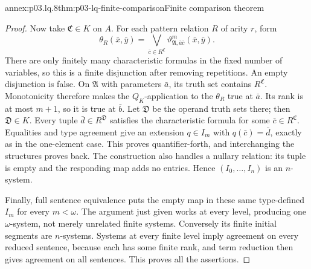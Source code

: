 \begin{annexitem}{annex:p03.lq.8}{thm:p03-lq-finite-comparison}{Finite comparison theorem}
\begin{proof}
Now take \(\mathfrak C\in K\) on \(A\). For each pattern relation
\(R\) of arity \(r\), form
\[
 \theta_R(\bar x,\bar y)
   =\bigvee_{\bar c\in R^{\mathfrak C}}
          \vartheta^m_{\mathfrak A,\bar a\bar c}(\bar x,\bar y).
\]
There are only finitely many characteristic formulas in the fixed
number of variables, so this is a finite disjunction after removing
repetitions. An empty disjunction is false. On \(\mathfrak A\)
with parameters \(\bar a\), its truth set contains
\(R^{\mathfrak C}\). Monotonicity therefore makes the
\(Q_K\)-application to the \(\theta_R\) true at \(\bar a\).
Its rank is at most \(m+1\), so it is true at \(\bar b\).
Let \(\mathfrak D\) be the operand truth sets there; then
\(\mathfrak D\in K\). Every tuple \(\bar d\in R^{\mathfrak D}\)
satisfies the characteristic formula for some
\(\bar c\in R^{\mathfrak C}\). Equalities and type agreement give
an extension \(q\in I_m\) with \(q(\bar c)=\bar d\), exactly
as in the one-element case. This proves quantifier-forth, and
interchanging the structures proves back. The construction also
handles a nullary relation: its tuple is empty and the responding
map adds no entries. Hence \((I_0,\ldots,I_n)\) is an \(n\)-system.

Finally, full sentence equivalence puts the empty map in these same
type-defined \(I_m\) for every \(m<\omega\). The argument just
given works at every level, producing one \(\omega\)-system, not
merely unrelated finite systems. Conversely its finite initial
segments are \(n\)-systems. Systems at every finite level imply
agreement on every reduced sentence, because each has some finite
rank, and term reduction then gives agreement on all sentences.
This proves all the assertions.
\end{proof}
\end{annexitem}

